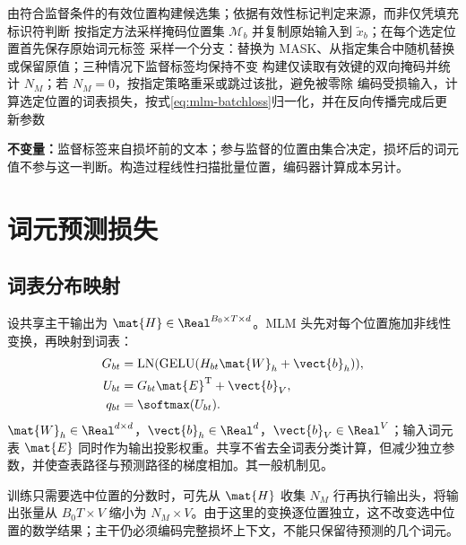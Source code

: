 \documentclass[../textbook.tex]{subfiles}
\begin{document}
\begin{algorithm}
\label{alg:mlm-batch}
\begin{myalgorithmic}[1]
\State 由符合监督条件的有效位置构建候选集；依据有效性标记判定来源，而非仅凭填充标识符判断
\State 按指定方法采样掩码位置集 $\mathcal M_b$ 并复制原始输入到 $\widetilde x_b$；在每个选定位置首先保存原始词元标签
  \State 采样一个分支：替换为 MASK、从指定集合中随机替换或保留原值；三种情况下监督标签均保持不变
\EndFor
\State 构建仅读取有效键的双向掩码并统计 $N_M$；若 $N_M=0$，按指定策略重采或跳过该批，避免被零除
\State 编码受损输入，计算选定位置的词表损失，按式\eqref{eq:mlm-batchloss}归一化，并在反向传播完成后更新参数
\end{myalgorithmic}
\textbf{不变量：}监督标签来自损坏前的文本；参与监督的位置由集合决定，损坏后的词元值不参与这一判断。构造过程线性扫描批量位置，编码器计算成本另计。
\end{algorithm}

\section{词元预测损失}

\subsection{词表分布映射}
设共享主干输出为 $\mat{H}\in\Real^{B_0\times T\times d}$。MLM 头先对每个位置施加非线性变换，再映射到词表：
\begin{align}
 G_{bt}&=\operatorname{LN}(\operatorname{GELU}(H_{bt}\mat{W}_h+\vect{b}_h)),\nonumber\\
 U_{bt}&=G_{bt}\mat{E}^{\mathrm{T}}+\vect{b}_V,\nonumber\\
 q_{bt}&=\softmax(U_{bt}).\label{eq:mlm-head}
\end{align}
$\mat{W}_h\in\Real^{d\times d}$，$\vect{b}_h\in\Real^d$，$\vect{b}_V\in\Real^V$；输入词元表 $\mat{E}$ 同时作为输出投影权重。共享不省去全词表分类计算，但减少独立参数，并使查表路径与预测路径的梯度相加。其一般机制见。

训练只需要选中位置的分数时，可先从 $\mat{H}$ 收集 $N_M$ 行再执行输出头，将输出张量从 $B_0T\times V$ 缩小为 $N_M\times V$。由于这里的变换逐位置独立，这不改变选中位置的数学结果；主干仍必须编码完整损坏上下文，不能只保留待预测的几个词元。
\end{document}
